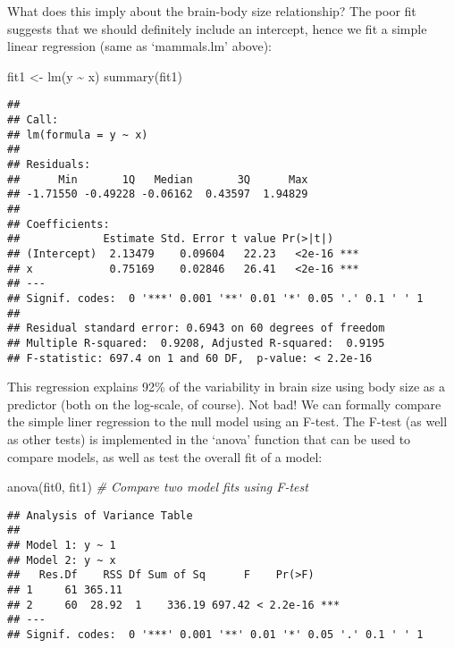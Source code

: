 \documentclass[
]{article}
\newenvironment{Shaded}{\begin{snugshade}}{\end{snugshade}}
\newcommand{\CommentTok}[1]{\textcolor[rgb]{0.56,0.35,0.01}{\textit{#1}}}
\newcommand{\FunctionTok}[1]{\textcolor[rgb]{0.00,0.00,0.00}{#1}}
\newcommand{\NormalTok}[1]{#1}
\newcommand{\OtherTok}[1]{\textcolor[rgb]{0.56,0.35,0.01}{#1}}
\newcommand{\SpecialCharTok}[1]{\textcolor[rgb]{0.00,0.00,0.00}{#1}}
\begin{document}
What does this imply about the brain-body size relationship? The poor
fit suggests that we should definitely include an intercept, hence we
fit a simple linear regression (same as `mammals.lm' above):

\begin{Shaded}
\begin{Highlighting}[]
\NormalTok{fit1 }\OtherTok{\textless{}{-}} \FunctionTok{lm}\NormalTok{(y }\SpecialCharTok{\textasciitilde{}}\NormalTok{ x)}
\FunctionTok{summary}\NormalTok{(fit1)       }
\end{Highlighting}
\end{Shaded}

\begin{verbatim}
## 
## Call:
## lm(formula = y ~ x)
## 
## Residuals:
##      Min       1Q   Median       3Q      Max 
## -1.71550 -0.49228 -0.06162  0.43597  1.94829 
## 
## Coefficients:
##             Estimate Std. Error t value Pr(>|t|)    
## (Intercept)  2.13479    0.09604   22.23   <2e-16 ***
## x            0.75169    0.02846   26.41   <2e-16 ***
## ---
## Signif. codes:  0 '***' 0.001 '**' 0.01 '*' 0.05 '.' 0.1 ' ' 1
## 
## Residual standard error: 0.6943 on 60 degrees of freedom
## Multiple R-squared:  0.9208, Adjusted R-squared:  0.9195 
## F-statistic: 697.4 on 1 and 60 DF,  p-value: < 2.2e-16
\end{verbatim}

This regression explains 92\% of the variability in brain size using
body size as a predictor (both on the log-scale, of course). Not bad! We
can formally compare the simple liner regression to the null model using
an F-test. The F-test (as well as other tests) is implemented in the
`anova' function that can be used to compare models, as well as test the
overall fit of a model:

\begin{Shaded}
\begin{Highlighting}[]
\FunctionTok{anova}\NormalTok{(fit0, fit1)       }\CommentTok{\# Compare two model fits using F{-}test}
\end{Highlighting}
\end{Shaded}

\begin{verbatim}
## Analysis of Variance Table
## 
## Model 1: y ~ 1
## Model 2: y ~ x
##   Res.Df    RSS Df Sum of Sq      F    Pr(>F)    
## 1     61 365.11                                  
## 2     60  28.92  1    336.19 697.42 < 2.2e-16 ***
## ---
## Signif. codes:  0 '***' 0.001 '**' 0.01 '*' 0.05 '.' 0.1 ' ' 1
\end{verbatim}
\end{document}
